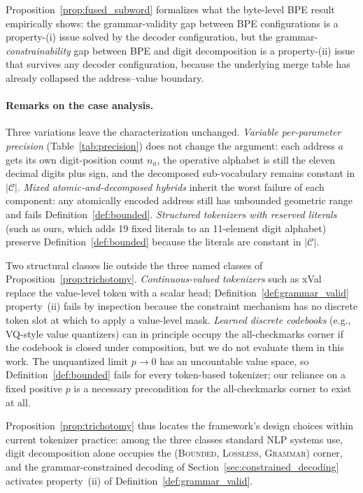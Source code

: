 \documentclass[sensors,article,submit,moreauthors,pdftex]{Definitions/mdpi}
\begin{document}
Proposition~\ref{prop:fused_subword} formalizes what the byte-level BPE result empirically shows: the grammar-validity gap between BPE configurations is a property-(i) issue solved by the decoder configuration, but the grammar-\emph{constrainability} gap between BPE and digit decomposition is a property-(ii) issue that survives any decoder configuration, because the underlying merge table has already collapsed the address--value boundary.

\paragraph{Remarks on the case analysis.}
Three variations leave the characterization unchanged. \textit{Variable per-parameter precision} (Table~\ref{tab:precision}) does not change the argument: each address $a$ gets its own digit-position count $n_a$, the operative alphabet is still the eleven decimal digits plus sign, and the decomposed sub-vocabulary remains constant in $|\mathcal{C}|$. \textit{Mixed atomic-and-decomposed hybrids} inherit the worst failure of each component: any atomically encoded address still has unbounded geometric range and fails Definition~\ref{def:bounded}. \textit{Structured tokenizers with reserved literals} (such as ours, which adds 19 fixed literals to an 11-element digit alphabet) preserve Definition~\ref{def:bounded} because the literals are constant in $|\mathcal{C}|$.

Two structural classes lie outside the three named classes of Proposition~\ref{prop:trichotomy}. \emph{Continuous-valued tokenizers} such as xVal~\cite{xval} replace the value-level token with a scalar head; Definition~\ref{def:grammar_valid} property~(ii) fails by inspection because the constraint mechanism has no discrete token slot at which to apply a value-level mask. \emph{Learned discrete codebooks} (e.g., VQ-style value quantizers) can in principle occupy the all-checkmarks corner if the codebook is closed under composition, but we do not evaluate them in this work. The unquantized limit $p \to 0$ has an uncountable value space, so Definition~\ref{def:bounded} fails for every token-based tokenizer; our reliance on a fixed positive $p$ is a necessary precondition for the all-checkmarks corner to exist at all.

Proposition~\ref{prop:trichotomy} thus locates the framework's design choices within current tokenizer practice: among the three classes standard NLP systems use, digit decomposition alone occupies the (\textsc{Bounded}, \textsc{Lossless}, \textsc{Grammar}) corner, and the grammar-constrained decoding of Section~\ref{sec:constrained_decoding} activates property~(ii) of Definition~\ref{def:grammar_valid}.
\end{document}
